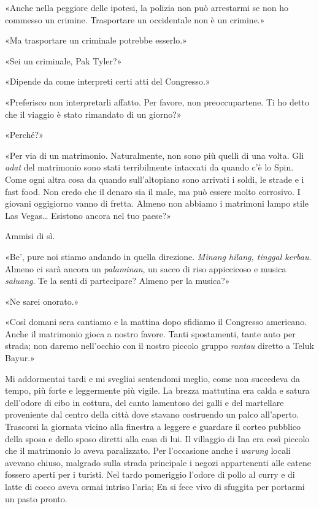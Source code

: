 «Anche nella peggiore delle ipotesi, la polizia non può arrestarmi se
non ho commesso un crimine. Trasportare un occidentale non è un
crimine.»

«Ma trasportare un criminale potrebbe esserlo.»

«Sei un criminale, Pak Tyler?»

«Dipende da come interpreti certi atti del Congresso.»

«Preferisco non interpretarli affatto. Per favore, non preoccupartene.
Ti ho detto che il viaggio è stato rimandato di un giorno?»

«Perché?»

«Per via di un matrimonio. Naturalmente, non sono più quelli di una
volta. Gli \emph{adat} del matrimonio sono stati terribilmente intaccati
da quando c'è lo Spin. Come ogni altra cosa da quando sull'altopiano
sono arrivati i soldi, le strade e i fast food. Non credo che il denaro
sia il male, ma può essere molto corrosivo. I giovani oggigiorno vanno
di fretta. Almeno non abbiamo i matrimoni lampo stile Las Vegas\ldots{}
Esistono ancora nel tuo paese?»

Ammisi di sì.

«Be', pure noi stiamo andando in quella direzione. \emph{Minang hilang,
	tinggal kerbau}. Almeno ci sarà ancora un \emph{palaminan}, un sacco di
riso appiccicoso e musica \emph{saluang}. Te la senti di partecipare?
Almeno per la musica?»

«Ne sarei onorato.»

«Così domani sera cantiamo e la mattina dopo sfidiamo il Congresso
americano. Anche il matrimonio gioca a nostro favore. Tanti spostamenti,
tante auto per strada; non daremo nell'occhio con il nostro piccolo
gruppo \emph{rantau} diretto a Teluk Bayur.»

Mi addormentai tardi e mi svegliai sentendomi meglio, come non succedeva
da tempo, più forte e leggermente più vigile. La brezza mattutina era
calda e satura dell'odore di cibo in cottura, del canto lamentoso dei
galli e del martellare proveniente dal centro della città dove stavano
costruendo un palco all'aperto. Trascorsi la giornata vicino alla
finestra a leggere e guardare il corteo pubblico della sposa e dello
sposo diretti alla casa di lui. Il villaggio di Ina era così piccolo che
il matrimonio lo aveva paralizzato. Per l'occasione anche i
\emph{warung} locali avevano chiuso, malgrado sulla strada principale i
negozi appartenenti alle catene fossero aperti per i turisti. Nel tardo
pomeriggio l'odore di pollo al curry e di latte di cocco aveva ormai
intriso l'aria; En si fece vivo di sfuggita per portarmi un pasto
pronto.

